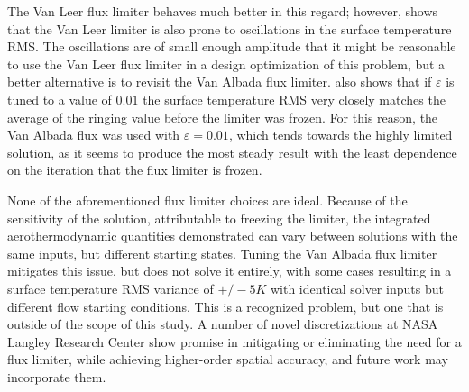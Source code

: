 The Van Leer flux limiter behaves much better in this regard; however,
 shows that the Van Leer limiter is also prone to
oscillations in the surface temperature RMS.  The oscillations are of small
enough amplitude that it might be reasonable to use the Van Leer flux limiter in
a design optimization of this problem, but a better alternative is to revisit
the Van Albada flux limiter.   also shows that if
$\varepsilon$ is tuned to a value of $0.01$ the surface temperature RMS very
closely matches the average of the ringing value before the limiter was frozen.
For this reason, the Van Albada flux was used with $\varepsilon = 0.01$, which
tends towards the highly limited solution, as it seems to produce the most
steady result with the least dependence on the iteration that the flux limiter
is frozen.

None of the aforementioned flux limiter choices are ideal.  Because of the
sensitivity of the solution, attributable to freezing the limiter, the integrated
aerothermodynamic quantities demonstrated can vary between solutions with the
same inputs, but different starting states.  Tuning the Van Albada flux limiter
mitigates this issue, but does not solve it entirely, with some cases resulting
in a surface temperature RMS variance of $+/- 5 K$ with identical solver inputs
but different flow starting conditions. This is a recognized problem, but one
that is outside of the scope of this study.  A number of novel discretizations
at NASA Langley Research
Center\cite{gnoffo2014global,mazaheri2014very,mazaheri2016high} show promise in
mitigating or eliminating the need for a flux limiter, while achieving
higher-order spatial accuracy, and future work may incorporate them.
